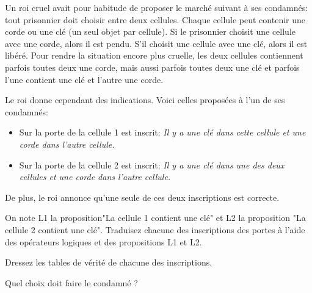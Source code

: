 \documentclass[12pt]{article}
\begin{document}
	\begin{MonExo}
		Un roi cruel avait pour habitude de proposer le marché suivant à ses condamnés: tout prisonnier doit choisir entre deux cellules. Chaque cellule peut contenir une corde ou une clé (un seul objet par cellule). Si le prisonnier choisit une cellule avec une corde, alors il est pendu. S’il choisit une cellule avec une clé, alors il est libéré. Pour rendre la situation encore plus cruelle, les deux cellules contiennent parfois toutes deux une corde, mais aussi parfois toutes deux une clé et parfois l’une contient une clé et l’autre une corde.
		
		Le roi donne cependant des indications. Voici celles proposées à l’un de ses condamnés:
		\begin{itemize}
			\item Sur la porte de la cellule 1 est inscrit: \textit{Il y a une clé dans cette cellule et une corde dans l’autre cellule.}
			\item Sur la porte de la cellule 2 est inscrit: \textit{Il y a une clé dans une des deux cellules et une corde dans l’autre cellule.}
		\end{itemize}
		
		De plus, le roi annonce qu’une seule de ces deux inscriptions est correcte.
		
		\begin{alphenum}
			\item On note L1 la proposition"La cellule 1 contient une clé" et L2 la proposition "La cellule 2 contient une clé". Traduisez chacune des inscriptions des portes à l’aide des opérateurs logiques et des propositions L1 et L2.
			\item Dressez les tables de vérité de chacune des inscriptions.
			\item Quel choix doit faire le condamné ?
		\end{alphenum}
	\end{MonExo}
\end{document}
